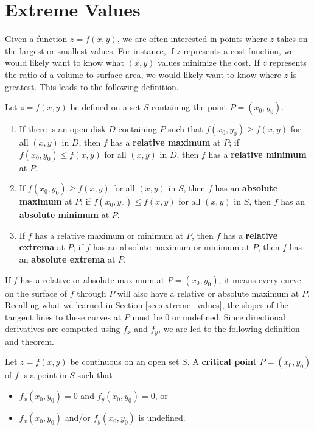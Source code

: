 \section{Extreme Values}\label{sec:multi_extreme_values}

Given a function $z=f(x,y)$, we are often interested in points where $z$ takes on the largest or smallest values. For instance, if $z$ represents a cost function, we would likely want to know what $(x,y)$ values minimize the cost. If $z$ represents the ratio of a volume to surface area, we would likely want to know where $z$ is greatest. This leads to the following definition.

{Let $z=f(x,y)$ be defined on a set $S$ containing the point $P=(x_0,y_0)$.
\begin{enumerate}
	\item If there is an open disk $D$ containing $P$ such that $f(x_0,y_0) \geq f(x,y)$ for all $(x,y)$ in $D$, then $f$ has a \textbf{relative maximum} at $P$; if $f(x_0,y_0) \leq f(x,y)$ for all $(x,y)$ in $D$, then $f$ has a \textbf{relative minimum} at $P$.
	
	\item	If $f(x_0,y_0)\geq f(x,y)$ for all $(x,y)$ in $S$, then $f$ has an \textbf{absolute maximum} at $P$; if $f(x_0,y_0)\leq f(x,y)$ for all $(x,y)$ in $S$, then $f$ has an \textbf{absolute minimum} at $P$.
	
	\item		If $f$ has a relative maximum or minimum at $P$, then $f$ has a \textbf{relative extrema} at $P$; if $f$ has an absolute maximum or minimum at $P$, then $f$ has an \textbf{absolute extrema} at $P$.
\end{enumerate}
}

If $f$ has a relative or absolute maximum at $P=(x_0,y_0)$, it means every curve on the surface of $f$ through $P$ will also have a relative or absolute maximum at $P$. Recalling what we learned in Section \ref{sec:extreme_values}, the slopes of the tangent lines to these curves at $P$ must be 0 or undefined. Since directional derivatives are computed using $f_x$ and $f_y$, we are led to the following definition and theorem.

{Let $z = f(x,y)$ be continuous on an open set $S$. A \textbf{critical point} $P=(x_0,y_0)$ of $f$ is a point in $S$ such that 
\begin{itemize}
	\item $f_x(x_0,y_0) = 0$ and $f_y(x_0,y_0) = 0$, or
	\item	$f_x(x_0,y_0)$ and/or $f_y(x_0,y_0)$ is undefined.
\end{itemize}
}

